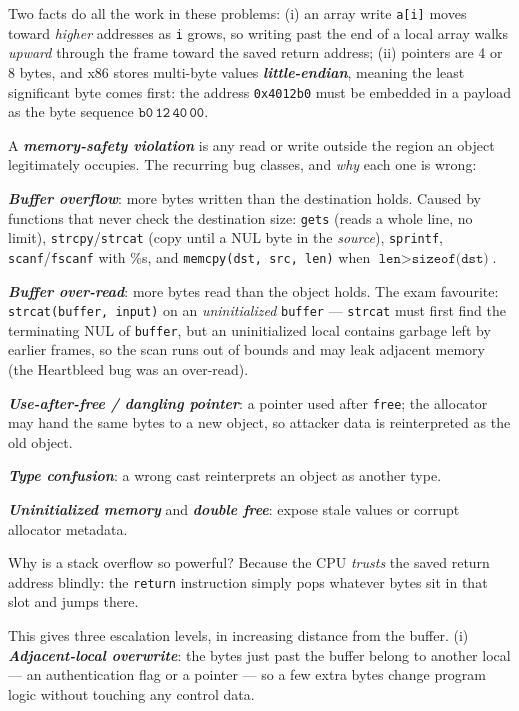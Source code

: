 \documentclass[12pt, a4paper]{article}
\newcommand{\term}[1]{\textbf{\textit{#1}}}        %
\begin{document}
Two facts do all the work in these problems: (i) an array write \texttt{a[i]} moves toward \emph{higher} addresses as \texttt{i} grows, so writing past the end of a local array walks \emph{upward} through the frame toward the saved return address; (ii) pointers are 4 or 8 bytes, and x86 stores multi-byte values \term{little-endian}, meaning the least significant byte comes first: the address \texttt{0x4012b0} must be embedded in a payload as the byte sequence $\texttt{b0}\,\texttt{12}\,\texttt{40}\,\texttt{00}$.

A \term{memory-safety violation} is any read or write outside the region an object legitimately occupies. The recurring bug classes, and \emph{why} each one is wrong:
\begin{tightitem}
    \item \term{Buffer overflow}: more bytes written than the destination holds. Caused by functions that never check the destination size: \texttt{gets} (reads a whole line, no limit), \texttt{strcpy}/\texttt{strcat} (copy until a NUL byte in the \emph{source}), \texttt{sprintf}, \texttt{scanf}/\texttt{fscanf} with \%s, and \texttt{memcpy(dst, src, len)} when $\texttt{len} > \texttt{sizeof(dst)}$.
    \item \term{Buffer over-read}: more bytes read than the object holds. The exam favourite: \texttt{strcat(buffer, input)} on an \emph{uninitialized} \texttt{buffer} --- \texttt{strcat} must first find the terminating NUL of \texttt{buffer}, but an uninitialized local contains garbage left by earlier frames, so the scan runs out of bounds and may leak adjacent memory (the Heartbleed bug was an over-read).
    \item \term{Use-after-free / dangling pointer}: a pointer used after \texttt{free}; the allocator may hand the same bytes to a new object, so attacker data is reinterpreted as the old object.
    \item \term{Type confusion}: a wrong cast reinterprets an object as another type.
    \item \term{Uninitialized memory} and \term{double free}: expose stale values or corrupt allocator metadata.
\end{tightitem}

Why is a stack overflow so powerful? Because the CPU \emph{trusts} the saved return address blindly: the \texttt{return} instruction simply pops whatever bytes sit in that slot and jumps there.

This gives three escalation levels, in increasing distance from the buffer. (i) \term{Adjacent-local overwrite}: the bytes just past the buffer belong to another local --- an authentication flag or a pointer --- so a few extra bytes change program logic without touching any control data.
\end{document}
